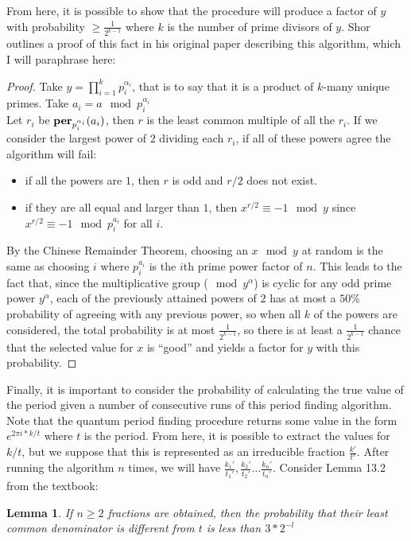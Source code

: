 \documentclass{exam} %
\theoremstyle{plain}
\newtheorem{lem}[thm]{Lemma}        \newtheorem*{lem*}{Lemma}
\theoremstyle{definition}
\theoremstyle{remark}
\numberwithin{equation}{section}  %
\newcommand{\per}{\text{\textbf{per}}}
\begin{document}
From here, it is possible to show that the procedure will produce a factor of 
$y$ with probability $\geq \frac{1}{2^{k-1}}$ where $k$ is the number of prime
divisors of $y$. Shor outlines a proof of this fact in his original paper
describing this algorithm, which I will paraphrase here:\\
\begin{proof}
  Take $y = \prod_{i=1}^{k} p_{i}^{\alpha_i}$, that is to say that it 
  is a product of $k$-many unique primes. Take $a_i = a\mod p_i^{\alpha_i}$ \\

  Let $r_i$ be $\per_{p_i^{\alpha_i}}(a_i)$, then $r$ is the least common
  multiple of all the $r_i$. If we consider the largest power of $2$ dividing
  each $r_i$, if all of these powers agree the algorithm will fail:
  \begin{itemize}
    \item if all the powers are $1$, then $r$ is odd and $r/2$ does not exist.
    \item if they are all equal and larger than $1$, then $x^{r/2} \equiv -1
      \mod y$ since $x^{r/2} \equiv -1 \mod p_i^{a_i}$ for all $i$. 
  \end{itemize}
  By the
  Chinese Remainder Theorem, choosing an $x\mod y$ at random is the same
  as choosing $i$ where $p_i^{a_i}$ is the $i$th prime power factor of $n$.
  This leads to the fact that, since the multiplicative group 
  ($\mod y^{\alpha}$) is cyclic for any odd prime power $y^{\alpha}$, each 
  of the previously attained powers of $2$ has at most a $50\%$ probability 
  of agreeing with any previous power, so when all $k$ of the powers are 
  considered, the total probability is at most $\frac{1}{2^{k-1}}$, so there
  is at least a $\frac{1}{2^{k-1}}$ chance that the selected value for $x$ is
  ``good'' and yields a factor for $y$ with this probability. 
\end{proof}

Finally, it is important to consider the probability of calculating the true
value of the period given a number of consecutive runs of this period finding
algorithm. Note that the quantum period finding procedure returns some 
value in the form $e^{2\pi i * k/t}$ where $t$ is the period. From here,
it is possible to extract the values for $k/t$, but we suppose that this
is represented as an irreducible fraction $\frac{k'}{t'}$. After running 
the algorithm $n$ times, we will have $\frac{k_1'}{t_1'},\frac{k_2'}{t_2'}
\hdots \frac{k_n'}{t_n'}$. Consider Lemma 13.2 from the textbook:\\
\begin{lem}
  If $n \geq 2$ fractions are obtained, then the probability that their 
  least common denominator is different from $t$ is less than $3*2^{-l}$
\end{lem}
\end{document}
